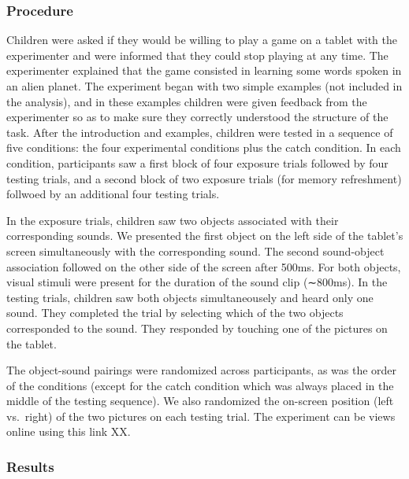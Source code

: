 \documentclass[10pt, letterpaper]{article}
\begin{document}
\subsubsection{Procedure}\label{procedure}

Children were asked if they would be willing to play a game on a tablet
with the experimenter and were informed that they could stop playing at
any time. The experimenter explained that the game consisted in learning
some words spoken in an alien planet. The experiment began with two
simple examples (not included in the analysis), and in these examples
children were given feedback from the experimenter so as to make sure
they correctly understood the structure of the task. After the
introduction and examples, children were tested in a sequence of five
conditions: the four experimental conditions plus the catch condition.
In each condition, participants saw a first block of four exposure
trials followed by four testing trials, and a second block of two
exposure trials (for memory refreshment) follwoed by an additional four
testing trials.

In the exposure trials, children saw two objects associated with their
corresponding sounds. We presented the first object on the left side of
the tablet's screen simultaneously with the corresponding sound. The
second sound-object association followed on the other side of the screen
after 500ms. For both objects, visual stimuli were present for the
duration of the sound clip (∼800ms). In the testing trials, children saw
both objects simultaneousely and heard only one sound. They completed
the trial by selecting which of the two objects corresponded to the
sound. They responded by touching one of the pictures on the tablet.

The object-sound pairings were randomized across participants, as was
the order of the conditions (except for the catch condition which was
always placed in the middle of the testing sequence). We also randomized
the on-screen position (left vs.~right) of the two pictures on each
testing trial. The experiment can be views online using this link XX.

\subsubsection{Results}\label{results}
\end{document}
